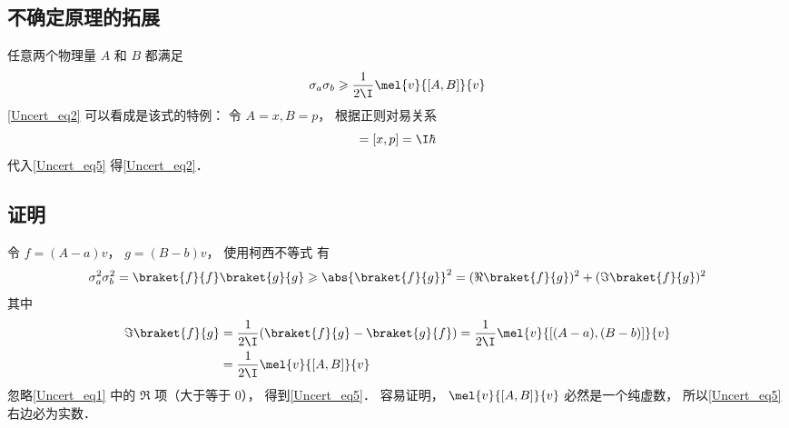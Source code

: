 \subsection{不确定原理的拓展}
任意两个物理量 $A$ 和 $B$ 都满足
\begin{equation}\label{Uncert_eq5}
\sigma_a \sigma_b \geqslant \frac{1}{2\I}\mel{v}{[A, B]}{v}
\end{equation}
\autoref{Uncert_eq2} 可以看成是该式的特例： 令 $A = x, B = p$， 根据正则对易关系
\begin{equation}
[A, B] = [x, p] = \I\hbar
\end{equation}
代入\autoref{Uncert_eq5} 得\autoref{Uncert_eq2}． 

\subsection{证明}
令 $f = (A-a)v$， $g = (B-b)v$， 使用柯西不等式 有
\begin{equation}\label{Uncert_eq1}
\sigma_a^2 \sigma_b^2 = \braket{f}{f} \braket{g}{g} \geqslant \abs{\braket{f}{g}}^2 = (\Re\braket{f}{g})^2 + (\Im\braket{f}{g})^2
\end{equation}
其中
\begin{equation}
\begin{aligned}
\Im\braket{f}{g} &= \frac{1}{2\I}(\braket{f}{g} - \braket{g}{f})
= \frac{1}{2\I}\mel{v}{[(A-a), (B-b)]}{v}\\
&= \frac{1}{2\I}\mel{v}{[A, B]}{v}
\end{aligned}
\end{equation}
忽略\autoref{Uncert_eq1} 中的 $\Re$ 项（大于等于 0）， 得到\autoref{Uncert_eq5}． 容易证明， $\mel{v}{[A, B]}{v}$ 必然是一个纯虚数， 所以\autoref{Uncert_eq5} 右边必为实数．
